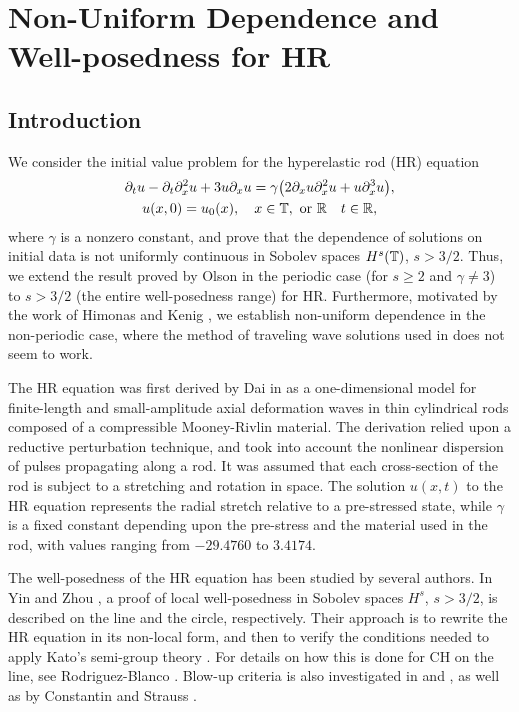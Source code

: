 \chapter{Non-Uniform Dependence and Well-posedness for 
HR}
\section{Introduction}
%
We consider the  initial value problem for
the hyperelastic rod (HR)  equation
%
%
\begin{gather}
\label{hr}
\partial_t u
-
\partial_t \partial_x^2 u
+
3u\partial_x u
=
\gamma \big (
2\partial_x u \partial_x^2 u
+
u \partial_x^3 u
\big ),
\\
\label{hr-data} u(x, 0) = u_0 (x),
\quad x \in \mathbb{T}, \ \text{or} \ \mathbb{R} \quad t \in \mathbb{R},
\end{gather}
%
%
where  $\gamma$  is a  nonzero constant,
and prove that the dependence of solutions on initial data is not uniformly 
continuous in Sobolev spaces $H^s(\mathbb{T})$, $s>3/2$.
Thus, we extend the result proved by Olson 
\cite{Olson_2006_Non-uniform-dep} in the periodic
case (for $s\ge 2$ and $\gamma \ne 3$)  to  $s>3/2$ (the entire 
well-posedness range) for HR\@. Furthermore,  motivated by the work of
Himonas  and Kenig \cite{Himonas:2009fk},
we establish non-uniform dependence
in the non-periodic case, where the method of traveling wave solutions used in  
\cite{Olson_2006_Non-uniform-dep} does not seem to work.
%
%

The HR equation was first
derived by Dai in \cite{Dai_1998_Model-equations} as a one-dimensional 
model for finite-length and
small-amplitude axial deformation waves in thin cylindrical
rods composed of a compressible Mooney-Rivlin
material. The derivation relied upon a reductive perturbation technique, 
and took into account the nonlinear dispersion of pulses propagating 
along a rod. It was assumed that each cross-section of the rod is 
subject to a stretching and rotation in space. The solution $u(x,t)$ to the 
HR equation represents the radial stretch relative
to a pre-stressed state, while $\gamma$ is a fixed constant depending upon 
the pre-stress and the material used in
the rod, with values ranging from $- 29.4760$ to $3.4174$.

%
The well-posedness of the HR equation has been studied by several authors. 
In Yin \cite{Yin_2003_On-the-Cauchy-p} and Zhou 
\cite{Zhou_2005_Local-well-pose}, a proof of local well-posedness in Sobolev 
spaces $H^s$,  $s > 3/2$, is described  on the line and the circle, respectively. 
Their approach is to rewrite the HR equation   
in its non-local form, and then to verify the conditions needed to apply 
Kato's semi-group theory \cite{Kato_1975_Quasi-linear-eq}. 
For details on how this is done for CH on the line, see Rodriguez-Blanco 
\cite{Rodriguez-Blanco_2001_On-the-Cauchy-p}. Blow-up criteria 
is also investigated in \cite{Yin_2003_On-the-Cauchy-p} and 
\cite{Zhou_2005_Local-well-pose}, as well as by Constantin and Strauss 
\cite{Constantin_2000_Stability-of-a-}. 


